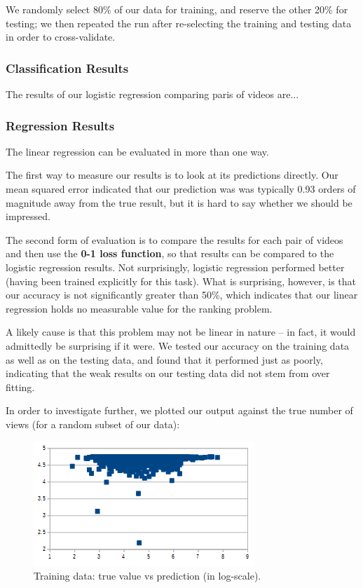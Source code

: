 We randomly select 80\% of our data for training, and reserve the other 20\% for testing; we then repeated the run after re-selecting the training and testing data in order to cross-validate.

\subsubsection{Classification Results}
	The results of our logistic regression comparing paris of videos are...
	
	
\subsubsection{Regression Results}
	The linear regression can be evaluated in more than one way.
	
	The first way to measure our results is to look at its predictions directly.  Our mean squared error indicated that our prediction was was typically 0.93 orders of magnitude away from the true result, but it is hard to say whether we should be impressed.
	
	The second form of evaluation is to compare the results for each pair of videos and then use the \textbf{0-1 loss function}, so that results can be compared to the logistic regression results.  Not surprisingly, logistic regression performed better (having been trained explicitly for this task).  What is surprising, however, is that our accuracy is not significantly greater than 50\%, which indicates that our linear regression holds no measurable value for the ranking problem.
	
	A likely cause is that this problem may not be linear in nature -- in fact, it would admittedly be surprising if it were.  We tested our accuracy on the training data as well as on the testing data, and found that it performed just as poorly, indicating that the weak results on our testing data did not stem from over fitting.
	
	In order to investigate further, we plotted our output against the true number of views (for a random subset of our data):

	\begin{figure}[!h]
		\begin{center}
			\includegraphics[width=.75\textwidth,clip]{logistic regression training.png}
		\end{center}
		\caption{Training data: true value vs prediction (in log-scale).}
		\label{fig:trainingTrueVsPredicted}
	\end{figure}
	
